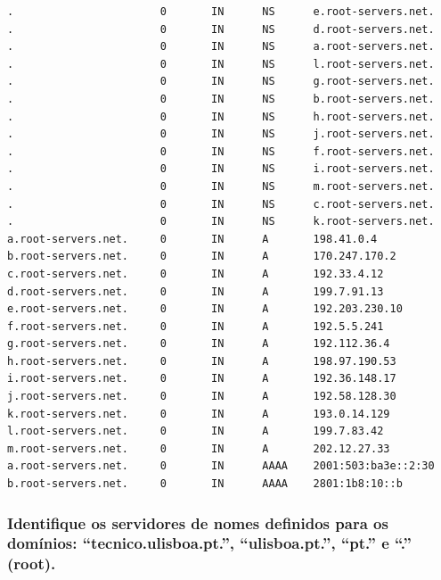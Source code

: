 \begin{itemize}
    \begin{verbatim}
.                       0       IN      NS      e.root-servers.net.
.                       0       IN      NS      d.root-servers.net.
.                       0       IN      NS      a.root-servers.net.
.                       0       IN      NS      l.root-servers.net.
.                       0       IN      NS      g.root-servers.net.
.                       0       IN      NS      b.root-servers.net.
.                       0       IN      NS      h.root-servers.net.
.                       0       IN      NS      j.root-servers.net.
.                       0       IN      NS      f.root-servers.net.
.                       0       IN      NS      i.root-servers.net.
.                       0       IN      NS      m.root-servers.net.
.                       0       IN      NS      c.root-servers.net.
.                       0       IN      NS      k.root-servers.net.
a.root-servers.net.     0       IN      A       198.41.0.4
b.root-servers.net.     0       IN      A       170.247.170.2
c.root-servers.net.     0       IN      A       192.33.4.12
d.root-servers.net.     0       IN      A       199.7.91.13
e.root-servers.net.     0       IN      A       192.203.230.10
f.root-servers.net.     0       IN      A       192.5.5.241
g.root-servers.net.     0       IN      A       192.112.36.4
h.root-servers.net.     0       IN      A       198.97.190.53
i.root-servers.net.     0       IN      A       192.36.148.17
j.root-servers.net.     0       IN      A       192.58.128.30
k.root-servers.net.     0       IN      A       193.0.14.129
l.root-servers.net.     0       IN      A       199.7.83.42
m.root-servers.net.     0       IN      A       202.12.27.33
a.root-servers.net.     0       IN      AAAA    2001:503:ba3e::2:30
b.root-servers.net.     0       IN      AAAA    2801:1b8:10::b
\end{verbatim}

\end{itemize}


\subsubsection{Identifique os servidores de nomes definidos para os 
domínios: “tecnico.ulisboa.pt.”, “ulisboa.pt.”, “pt.” e “.” (root).}

